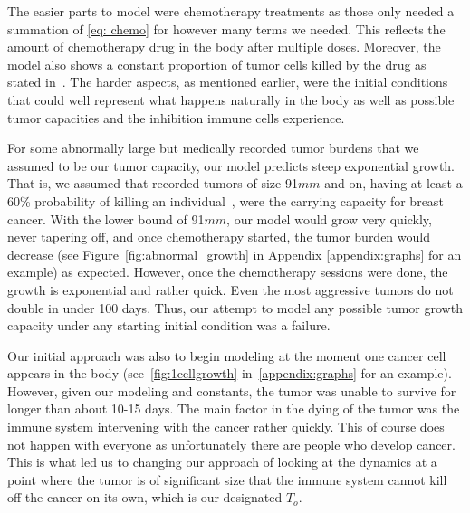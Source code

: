 \documentclass[11pt]{amsart}
\begin{document}
The easier parts to model were chemotherapy treatments as those only needed a summation of \eqref{eq: chemo} for however many terms we needed.
This reflects the amount of chemotherapy drug in the body after multiple doses.
Moreover, the model also shows a constant proportion of tumor cells killed by the drug as stated in\ \cite{CALEY2012186}.
The harder aspects, as mentioned earlier, were the initial conditions that could well represent what happens naturally in the body as well as possible tumor capacities and the inhibition immune cells experience. 

For some abnormally large but medically recorded tumor burdens that we assumed to be our tumor capacity, our model predicts steep exponential growth.
That is, we assumed that recorded tumors of size 91$mm$ and on, having at least a 60\% probability of killing an individual\ \cite{SopikTumorSize}, were the carrying capacity for breast cancer.
With the lower bound of 91$mm$, our model would grow very quickly, never tapering off, and once chemotherapy started, the tumor burden would decrease (see Figure~\ref{fig:abnormal_growth} in Appendix \ref{appendix:graphs} for an example) as expected.
However, once the chemotherapy sessions were done, the growth is exponential and rather quick.
Even the most aggressive tumors do not double in under 100 days.
Thus, our attempt to model any possible tumor growth capacity under any starting initial condition was a failure.

Our initial approach was also to begin modeling at the moment one cancer cell appears in the body (see\ \ref{fig:1cellgrowth} in\ \ref{appendix:graphs} for an example).
However, given our modeling and constants, the tumor was unable to survive for longer than about 10-15 days.
The main factor in the dying of the tumor was the immune system intervening with the cancer rather quickly.
This of course does not happen with everyone as unfortunately there are people who develop cancer.
This is what led us to changing our approach of looking at the dynamics at a point where the tumor is of significant size that the immune system cannot kill off the cancer on its own, which is our designated $T_o$.

\end{document}
